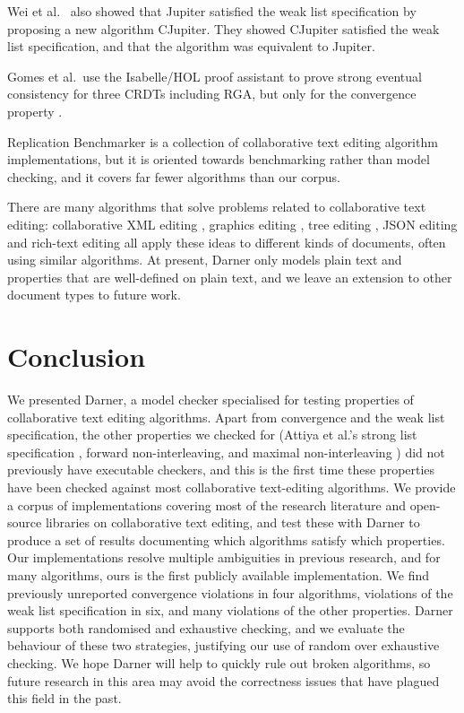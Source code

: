 \documentclass[sigplan,10pt,review,anonymous]{acmart}
\begin{document}
Wei et al.\ \cite{Wei2018} also showed that Jupiter satisfied the weak list specification by proposing a new algorithm CJupiter. They showed CJupiter satisfied the weak list specification, and that the algorithm was equivalent to Jupiter.


Gomes et al.\ use the Isabelle/HOL proof assistant to prove strong eventual consistency for three CRDTs including RGA, but only for the convergence property \cite{Gomes2017}.

Replication Benchmarker \cite{Urso2016} is a collection of collaborative text editing algorithm implementations, but it is oriented towards benchmarking rather than model checking, and it covers far fewer algorithms than our corpus.

There are many algorithms that solve problems related to collaborative text editing: collaborative XML editing \cite{Davis2002, Martin2010report}, graphics editing \cite{Sun2002}, tree editing \cite{Molli2003, Jungnickel2015}, JSON editing \cite{Jungnickel2016, Kleppmann2017} and rich-text editing \cite{Litt2022} all apply these ideas to different kinds of documents, often using similar algorithms. At present, Darner only models plain text and properties that are well-defined on plain text, and we leave an extension to other document types to future work.

\section{Conclusion}

We presented Darner, a model checker specialised for testing properties of collaborative text editing algorithms. Apart from convergence and the weak list specification, the other properties we checked for (Attiya et al.'s strong list specification \cite{Attiya2016}, forward non-interleaving, and maximal non-interleaving \cite{Weidner2025Fugue}) did not previously have executable checkers, and this is the first time these properties have been checked against most collaborative text-editing algorithms. 
We provide a corpus of implementations covering most of the research literature and open-source libraries on collaborative text editing, and test these with Darner to produce a set of results documenting which algorithms satisfy which properties.
Our implementations resolve multiple ambiguities in previous research, and for many algorithms, ours is the first publicly available implementation. We find previously unreported convergence violations in four algorithms, violations of the weak list specification in six, and many violations of the other properties.
Darner supports both randomised and exhaustive checking, and we evaluate the behaviour of these two strategies, justifying our use of random over exhaustive checking. We hope Darner will help to quickly rule out broken algorithms, so future research in this area may avoid the correctness issues that have plagued this field in the past.
\end{document}
